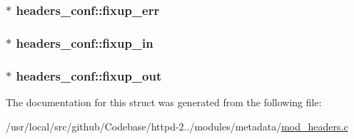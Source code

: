 \subsubsection[{\texorpdfstring{fixup\+\_\+err}{fixup_err}}]{$\ast$ headers\+\_\+conf\+::fixup\+\_\+err}\hypertarget{structheaders__conf_a7ff6647cf1dc4383b658b1ce8e485dcc}{}\label{structheaders__conf_a7ff6647cf1dc4383b658b1ce8e485dcc}
\subsubsection[{\texorpdfstring{fixup\+\_\+in}{fixup_in}}]{$\ast$ headers\+\_\+conf\+::fixup\+\_\+in}\hypertarget{structheaders__conf_a0d9d82ebef3c748e93e881ae50f0e267}{}\label{structheaders__conf_a0d9d82ebef3c748e93e881ae50f0e267}
\subsubsection[{\texorpdfstring{fixup\+\_\+out}{fixup_out}}]{$\ast$ headers\+\_\+conf\+::fixup\+\_\+out}\hypertarget{structheaders__conf_a6b51c1582b3948a44a80c1064acd65aa}{}\label{structheaders__conf_a6b51c1582b3948a44a80c1064acd65aa}


The documentation for this struct was generated from the following file\+:\begin{DoxyCompactItemize}
\item 
/usr/local/src/github/\+Codebase/httpd-\/2../modules/metadata/\hyperlink{mod__headers_8c}{mod\+\_\+headers.\+c}\end{DoxyCompactItemize}
